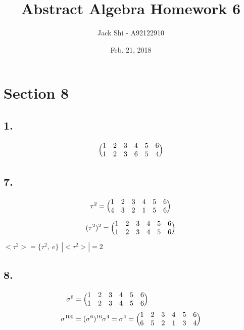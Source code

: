 \documentclass{article}
\title{Abstract Algebra Homework 6}
\author{Jack Shi - A92122910}
\date{Feb. 21, 2018}
\begin{document}
\maketitle
\section*{Section 8 }
\subsection*{1. }
\begin{equation*}
	\Bigl(\begin{matrix}
		1 & 2 & 3 & 4 & 5 & 6\\
		1 & 2 & 3 & 6 & 5 & 4\\
	\end{matrix}\Bigr)
\end{equation*}
\subsection*{7. }
\begin{equation*}
	\tau^2 = 
	\Bigl(\begin{matrix}
		1 & 2 & 3 & 4 & 5 & 6\\
		4 & 3 & 2 & 1 & 5 & 6\\
	\end{matrix}\Bigr)
\end{equation*}
\begin{equation*}
	(\tau^2)^2 = 
	\Bigl(\begin{matrix}
		1 & 2 & 3 & 4 & 5 & 6\\
		1 & 2 & 3 & 4 & 5 & 6\\
	\end{matrix}\Bigr)
\end{equation*}
$<\tau^2> = \{\tau^2,\ e\}$ \qquad $|<\tau^2>| = 2$

\subsection*{8. }
\begin{align*}
	\sigma^6 &= 
	\Bigl(\begin{matrix}
		1 & 2 & 3 & 4 & 5 & 6\\
		1 & 2 & 3 & 4 & 5 & 6\\
	\end{matrix}\Bigr)\\
	\sigma^{100} &= (\sigma^6)^{16}\sigma^4 = \sigma^4 = 
	\Bigl(\begin{matrix}
		1 & 2 & 3 & 4 & 5 & 6\\
		6 & 5 & 2 & 1 & 3 & 4\\
	\end{matrix}\Bigr)
\end{align*}
\end{document}
